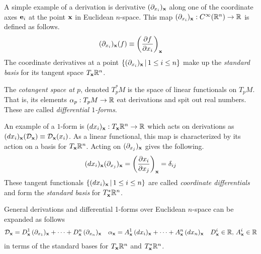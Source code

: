 \documentclass[11pt]{article}
\numberwithin{equation}{section}
\begin{document}
\begin{ex}
A simple example of a derivation is derivative $(\partial_{x_i})_{\mathbf{x}}$ along one of the coordinate axes $\mathbf{e}_i$ at the point $\mathbf{x}$ in Euclidean $n$-space.
This map $(\partial_{x_i})_{\mathbf{x}}:C^\infty(\mathbb{R}^n)\rightarrow\mathbb{R}$ is defined as follows.
\begin{align}
\label{eq:coordinate-directional-derivative}
  (\partial_{x_i})_{\mathbf{x}}(f)
\equiv
  \left(\frac {\partial f}{\partial x_i}\right)_{\mathbf{x}}
\end{align}
The coordinate derivatives at a point $\{(\partial_{x_i})_{\mathbf{x}}\,|\,1\leq i\leq n\}$ make up the \textit{standard basis} for its tangent space $T_{\mathbf{x}}\mathbb{R}^n$.
\end{ex}

\begin{dfn}
The \textit{cotangent space at $p$}, denoted $T_p^*M$ is the space of linear functionals on $T_pM$.
That is, its elements $\alpha _p:T_pM\rightarrow\mathbb{R}$ eat derivations and spit out real numbers.
These are called \textit{differential $1$-forms}.
\end{dfn}

\begin{ex}
An example of a $1$-form is $(dx_i)_{\mathbf{x}}:T_{\mathbf{x}}\mathbb{R}^n\rightarrow\mathbb{R}$ which acts on derivations as $(dx_i)_{\mathbf{x}}(\mathcal{D}_{\mathbf{x}})\equiv\mathcal{D}_{\mathbf{x}}(x_i)$.
As a linear functional, this map is characterized by its action on a basis for $T_{\mathbf{x}}\mathbb{R}^n$.
Acting on $(\partial_{x_j})_{\mathbf{x}}$ gives the following.
\begin{align}
\label{eq:coordinate-independence}
  (dx_i)_{\mathbf{x}}
  (\partial_{x_j})_{\mathbf{x}}
=
  \left(\frac {\partial x_i}{\partial x_j}\right)_{\mathbf{x}}
=
  \delta _{ij}
\end{align}
These tangent functionals $\{(dx_i)_{\mathbf{x}}\,|\,1\leq i\leq n\}$ are called \textit{coordinate differentials} and form the \textit{standard basis} for $T_{\mathbf{x}}^*\mathbb{R}^n$.
\end{ex}

\begin{ex}
\label{ex:tangent-cotangent-expansions}
General derivations and differential 1-forms over Euclidean $n$-space can be expanded as follows
\begin{align}
  \mathcal{D}_{\mathbf{x}}
=
  D_{\mathbf{x}}^1\,
  (\partial_{x_1})_{\mathbf{x}}
+
\cdots
+
  D_{\mathbf{x}}^n\,
  (\partial_{x_n})_{\mathbf{x}}
&&
  \alpha _{\mathbf{x}}
=
  A_{\mathbf{x}}^1\,
  (dx_i)_{\mathbf{x}}
+
\cdots
+
  A_{\mathbf{x}}^n\,
  (dx_n)_{\mathbf{x}}
&&
  D_{\mathbf{x}}^i
\in
  \mathbb{R}
,\,
  A_{\mathbf{x}}^i
\in
  \mathbb{R}
\end{align}
in terms of the standard bases for $T_{\mathbf{x}}\mathbb{R}^n$ and $T_{\mathbf{x}}^*\mathbb{R}^n$.
\end{ex}
\end{document}
